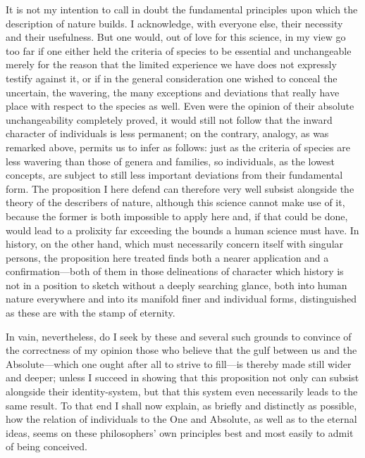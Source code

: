 \documentclass[12pt,a4paper]{article}
\begin{document}
It is not my intention to call in doubt the fundamental principles upon which
the description of nature builds. I acknowledge, with everyone else, their
necessity and their usefulness. But one would, out of love for this science, in
my view go too far if one either held the criteria of species to be essential
and unchangeable merely for the reason that the limited experience we have does
not expressly testify against it, or if in the general consideration one wished
to conceal the uncertain, the wavering, the many exceptions and deviations that
really have place with respect to the species as well. Even were the opinion of
their absolute unchangeability completely proved, it would still not follow that
the inward character of individuals is less permanent; on the contrary, analogy,
as was remarked above, permits us to infer as follows: just as the criteria of
species are less wavering than those of genera and families, so individuals, as
the lowest concepts, are subject to still less important deviations from their
fundamental form. The proposition I here defend can therefore very well subsist
alongside the theory of the describers of nature, although this science cannot
make use of it, because the former is both impossible to apply here and, if that
could be done, would lead to a prolixity far exceeding the bounds a human
science must have. In history, on the other hand, which must necessarily concern
itself with singular persons, the proposition here treated finds both a nearer
application and a confirmation---both of them in those delineations of character
which history is not in a position to sketch without a deeply
searching glance, both into human nature everywhere and into its manifold finer
and individual forms, distinguished as these are with the stamp of eternity.

In vain, nevertheless, do I seek by these and several such grounds to convince
of the correctness of my opinion those who believe that the gulf between us and
the Absolute---which one ought after all to strive to fill---is thereby made
still wider and deeper; unless I succeed in showing that this proposition not
only can subsist alongside their identity-system, but that this system even
necessarily leads to the same result. To that end I shall now explain, as
briefly and distinctly as possible, how the relation of individuals to the One
and Absolute, as well as to the eternal ideas, seems on these philosophers' own
principles best and most easily to admit of being conceived.
\end{document}
